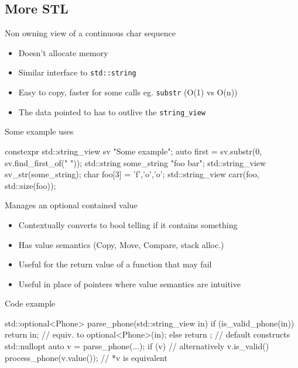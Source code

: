 \subsection{More STL}

\begin{frame}[fragile]
  \begin{block}{Non owning view of a continuous char sequence}
    \begin{itemize}
    \item Doesn't allocate memory
    \item Similar interface to \texttt{std::string}
    \item Easy to copy, faster for some calls eg. \texttt{substr} (O(1) vs O(n))
    \item The data pointed to has to outlive the \texttt{string\_view}
    \end{itemize}
  \end{block}
  \begin{exampleblock}{Some example uses}
    \begin{cppcode*}{}
      constexpr std::string_view sv {"Some example"};
      auto first = sv.substr(0, sv.find_first_of(" "));
      std::string some_string {"foo bar"};
      std::string_view sv_str(some_string);
      char foo[3] = {'f','o','o'};
      std::string_view carr(foo, std::size(foo));
    \end{cppcode*}
  \end{exampleblock}
\end{frame}

\begin{frame}[fragile]
  \begin{block}{Manages an optional contained value}
    \begin{itemize}
    \item Contextually converts to bool telling if it contains something
    \item Has value semantics (Copy, Move, Compare, stack alloc.)
    \item Useful for the return value of a function that may fail
    \item Useful in place of pointers where value semantics are intuitive
    \end{itemize}
  \end{block}
  \begin{exampleblock}{Code example}
    \small
    \begin{cppcode*}{}
      std::optional<Phone> parse_phone(std::string_view in) {
        if (is_valid_phone(in))
          return in;   // equiv. to optional<Phone>(in);
        else
          return {};   // default constructs std::nullopt
      }
      auto v = parse_phone(...);
      if (v) {            // alternatively v.is_valid()
        process_phone(v.value()); // *v is equivalent
      }
    \end{cppcode*}
  \end{exampleblock}
\end{frame}

